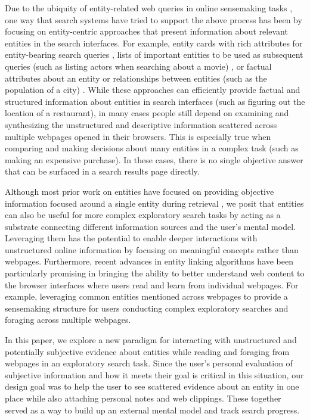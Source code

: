 Due to the ubiquity of entity-related web queries in online sensemaking tasks \cite{guo2009named,lin2012active}, one way that search systems have tried to support the above process has been by focusing on entity-centric approaches that present information about relevant entities in the search interfaces. For example, entity cards with rich attributes for entity-bearing search queries \cite{miliaraki2015selena,bota}, lists of important entities to be used as subsequent queries (such as listing actors when searching about a movie) \cite{blanco2013entity,bordino2013penguins,klouche2015designing}, or factual attributes about an entity or relationships between entities (such as the population of a city) \cite{balog2010overview,cheng2007entityrank,D15-1038}. While these approaches can efficiently provide factual and structured information about entities in search interfaces  (such as figuring out the location of a restaurant), in many cases people still depend on examining and synthesizing the unstructured and descriptive information scattered across multiple webpages opened in their browsers. This is especially true when comparing and making decisions about many entities in a complex task (such as making an expensive purchase). In these cases, there is no single objective answer that can be surfaced in a search results page directly. 

Although most prior work on entities have focused on providing objective information focused around a single entity during retrieval \cite{miliaraki2015selena,bota}, we posit that entities can also be useful for more complex exploratory search tasks by acting as a substrate connecting different information sources and the user's mental model. Leveraging them has the potential to enable deeper interactions with unstructured online information by focusing on meaningful concepts rather than webpages. Furthermore, recent advances in entity linking algorithms have been particularly promising in bringing the ability to better understand web content to the browser interfaces where users read and learn from individual webpages. For example, leveraging common entities mentioned across webpages to provide a sensemaking structure for users conducting complex exploratory searches and foraging across multiple webpages.

In this paper, we explore a new paradigm for interacting with unstructured and potentially subjective evidence about entities while reading and foraging from webpages in an exploratory search task. Since the user's personal evaluation of subjective information and how it meets their goal is critical in this situation, our design goal was to help the user to see scattered evidence about an entity in one place while also attaching personal notes and web clippings. These together served as a way to build up an external mental model and track search progress.

